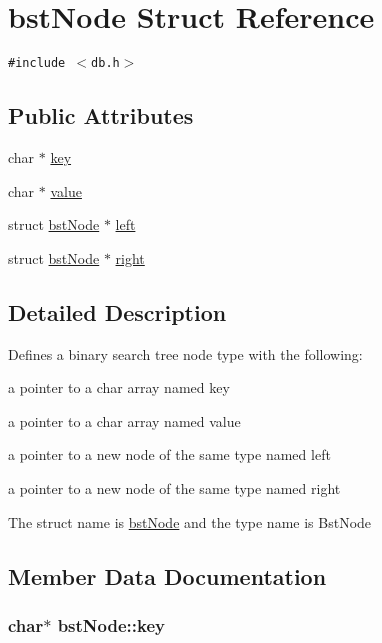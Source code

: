 \hypertarget{structbstNode}{
\section{bstNode Struct Reference}
\label{structbstNode}
}
{\tt \#include $<$db.h$>$}

\subsection*{Public Attributes}
\begin{CompactItemize}
\item 
char $\ast$ \hyperlink{structbstNode_b03ef01e79f2d95f40f0333903e67af6}{key}
\item 
char $\ast$ \hyperlink{structbstNode_c775df568f03e0b1274a81912f90867c}{value}
\item 
struct \hyperlink{structbstNode}{bstNode} $\ast$ \hyperlink{structbstNode_b9886f8c7058240f62de8a34e6adb41a}{left}
\item 
struct \hyperlink{structbstNode}{bstNode} $\ast$ \hyperlink{structbstNode_08982f9d00879a4b1f392972c3663f58}{right}
\end{CompactItemize}


\subsection{Detailed Description}
Defines a binary search tree node type with the following:\par
 a pointer to a char array named key\par
 a pointer to a char array named value\par
 a pointer to a new node of the same type named left\par
 a pointer to a new node of the same type named right \par
 The struct name is \hyperlink{structbstNode}{bstNode} and the type name is BstNode\par
 

\subsection{Member Data Documentation}
\hypertarget{structbstNode_b03ef01e79f2d95f40f0333903e67af6}{
\subsubsection[{key}]{\setlength{\rightskip}{0pt plus 5cm}char$\ast$ {\bf bstNode::key}}}
\label{structbstNode_b03ef01e79f2d95f40f0333903e67af6}


